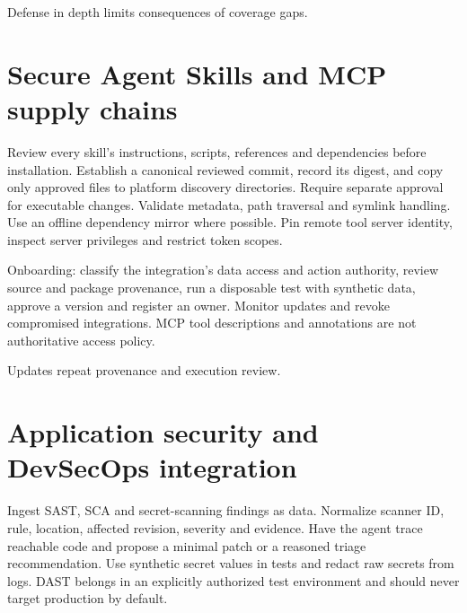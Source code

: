 \documentclass[11pt,letterpaper]{article}
\begin{document}
\begin{center}\begin{minipage}{\linewidth}\captionsetup{type=figure}\centering{}\caption{Permission and sandbox enforcement}
\small Defense in depth limits consequences of coverage gaps.\end{minipage}\end{center}
\section{Secure Agent Skills and MCP supply chains}
Review every skill's instructions, scripts, references and dependencies before installation. Establish a canonical reviewed commit, record its digest, and copy only approved files to platform discovery directories. Require separate approval for executable changes. Validate metadata, path traversal and symlink handling. Use an offline dependency mirror where possible. Pin remote tool server identity, inspect server privileges and restrict token scopes.

Onboarding: classify the integration's data access and action authority, review source and package provenance, run a disposable test with synthetic data, approve a version and register an owner. Monitor updates and revoke compromised integrations. MCP tool descriptions and annotations are not authoritative access policy. \cite{spec,mcp}

\begin{center}\begin{minipage}{\linewidth}\captionsetup{type=figure}\centering{}\caption{Secure skill distribution}
\small Updates repeat provenance and execution review.\end{minipage}\end{center}
\section{Application security and DevSecOps integration}
Ingest SAST, SCA and secret-scanning findings as data. Normalize scanner ID, rule, location, affected revision, severity and evidence. Have the agent trace reachable code and propose a minimal patch or a reasoned triage recommendation. Use synthetic secret values in tests and redact raw secrets from logs. DAST belongs in an explicitly authorized test environment and should never target production by default.
\end{document}
